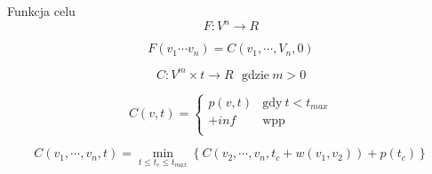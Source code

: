 \begin{block}{Funkcja celu}
	\begin{equation}
		F : V^n \rightarrow R
	\end{equation}

	\begin{equation}
		F(v_1 \cdots v_n) = C(v_1, \cdots, V_n, 0)
	\end{equation}

	\begin{equation}
		C : V^m \times t \rightarrow R \ \ \ \text{gdzie} \ m > 0
	\end{equation}

	\begin{equation}
		C(v, t) = \begin{cases}
			p(v, t) 	& \text{gdy} \ t < t_{max} 	\\
			+inf	 	& \text{wpp}			\\
		\end{cases}
	\end{equation}

	\begin{equation}
		C(v_1, \cdots, v_n, t) = \min\limits_{t \leq t_c \le t_{max}}\left\{ C(v_2, \cdots, v_n, t_c + w(v_1, v_2)) + p(t_c) \right\}
	\end{equation}

\end{block}
